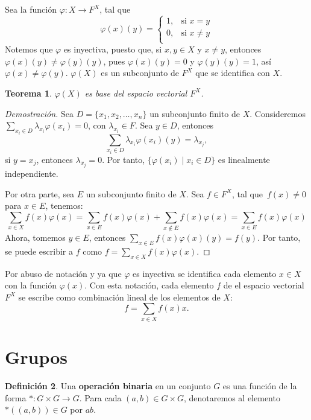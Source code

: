 \documentclass[12pt]{book}
\newtheorem{theorem}{Teorema}[section]
\theoremstyle{definition}
\newtheorem{definition}[theorem]{Definición}
\newcounter{in}
\newcounter{ini}
\begin{document}
  Sea la función $\varphi:X\rightarrow F^{X}$, tal que
  \[
  \varphi(x)(y)=
  \begin{cases}
    1, & \text{si } x=y \\
    0, & \text{si } x\neq y \\
  \end{cases}
  \]
Notemos que $\varphi$ es inyectiva, puesto que, si $x,y\in X$ y $x\neq y$,
entonces $\varphi(x)(y)\neq\varphi(y)(y)$, pues
$\varphi(x)(y)=0$ y $\varphi(y)(y)=1$, así
$\varphi(x)\neq\varphi(y)$. $\varphi(X)$ es un subconjunto de $F^{X}$ que
se identifica con $X$.
\begin{theorem}
  \label{base-FX}
  $\varphi(X)$ es base del espacio vectorial $F^{X}$.
\end{theorem}
\begin{proof}[Demostración]
  Sea $D=\{x_{1},x_{2},\dots,x_{n}\}$ un subconjunto finito de $X$. Consideremos
  $\sum_{x_{i}\in D} \lambda_{x_{i}}\varphi(x_{i})=0$, con
  $\lambda_{x_{i}}\in F$. Sea $y\in D$, entonces
  $$\sum_{x_{i}\in D} \lambda_{x_{i}}\varphi(x_{i})(y)=\lambda_{x_{j}},$$
  si $y=x_{j}$, entonces $\lambda_{x_{j}}=0$. Por tanto, $\{\varphi(x_{i})\mid x_{i}\in D\}$ es linealmente independiente.

  Por otra parte, sea $E$ un subconjunto finito de $X$. Sea $f\in F^{X}$, tal que~$f(x)\neq 0$ para $x\in E$, tenemos:
  $$\sum_{x\in X}f(x)\varphi(x)=\sum_{x\in
    E}f(x)\varphi(x)+\sum_{x\not\in E}f(x)\varphi(x)=\sum_{x\in E}f(x)\varphi(x)$$
  Ahora, tomemos $y\in E$, entonces $\sum_{x\in
    E}f(x)\varphi(x)(y)=f(y)$. Por tanto, se puede escribir a $f$ como $f=\sum_{x\in X}f(x)\varphi(x)$. 
\end{proof}

Por abuso de notación y ya que $\varphi$ es inyectiva se
identifica cada elemento $x\in X$ con la función
$\varphi(x)$. Con esta notación, cada elemento $f$ de el espacio vectorial
$F^{X}$ se escribe como combinación lineal de los elementos de $X$:
\begin{equation}
  \label{sumas-formales}
  f=\sum_{x\in X} f(x)x.
\end{equation}

\section{Grupos}
\label{grupos}

\begin{definition}
  Una \textbf{operación binaria} en un conjunto $G$ es una función
  de la forma $*:G  \times G \rightarrow G$. Para cada $(a,b)\in G
  \times G$, denotaremos al elemento~$*((a,b))\in G$ por $ab$. 
\end{definition} 
\end{document}
